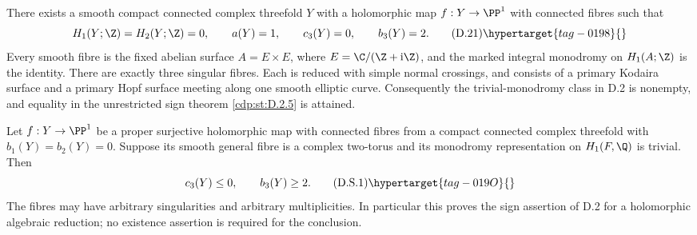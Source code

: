 \begin{proposition}\hypertarget{tag-01GE}{}\label{cdp:st:D.2.7}



There exists a smooth compact connected complex threefold $Y$
with a holomorphic map $f:Y\to\PP^1$ with connected fibres such
that
\[
 H_1(Y;\Z)=H_2(Y;\Z)=0,\qquad
 a(Y)=1,\qquad c_3(Y)=0,\qquad b_3(Y)=2.
\tag{D.21}\hypertarget{tag-0198}{}\label{cdp:eq:D.21}
\]
Every smooth fibre is the fixed abelian surface
$A=E\times E$, where $E=\C/(\Z+\mathrm i\Z)$, and the marked
integral monodromy on $H_1(A;\Z)$ is the identity. There are
exactly three singular fibres. Each is reduced with simple
normal crossings, and consists of a primary Kodaira surface
and a primary Hopf surface meeting along one smooth elliptic
curve. Consequently the trivial-monodromy class in D.2 is
nonempty, and equality in the unrestricted sign theorem
\ref{cdp:st:D.2.5} is attained.
\end{proposition}

\begin{proposition}\hypertarget{tag-01GC}{}\label{cdp:st:D.2.5}



Let $f:Y\to\PP^1$ be a proper surjective holomorphic map with
connected fibres from a compact connected complex threefold with
$b_1(Y)=b_2(Y)=0$. Suppose its smooth general fibre is a complex
two-torus and its monodromy representation on $H_1(F,\Q)$ is
trivial. Then
\[
 c_3(Y)\le0,\qquad b_3(Y)\ge2.
 \tag{D.S.1}\hypertarget{tag-019O}{}\label{cdp:eq:D.S.1}
\]
The fibres may have arbitrary singularities and arbitrary
multiplicities. In particular this proves the sign assertion of
D.2 for a holomorphic algebraic reduction; no existence assertion
is required for the conclusion.
\end{proposition}

